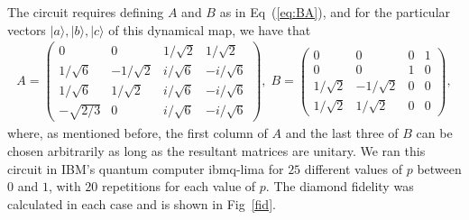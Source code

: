 \documentclass[10pt,letterpaper]{article} %
\newcommand{\fref}[1]{Fig~\ref{#1}}
\newcommand{\eref}[1]{Eq~(\ref{#1})}
\begin{document}
\begin{itemize}
The circuit requires defining $A$ and $B$ as in  \eref{eq:BA}, and for the particular
vectors $|a\rangle, |b\rangle, |c \rangle$ of this dynamical map, we have that
\begin{align*}
A = \begin{pmatrix}
0 & 0 & 1/\sqrt{2} & 1/\sqrt{2} \\
1/\sqrt{6} & -1/\sqrt{2} & i /\sqrt{6} & -i /\sqrt{6} \\
1/\sqrt{6}  & 1/\sqrt{2} & i/\sqrt{6} & -i/\sqrt{6} \\
-\sqrt{2/3} & 0 & i/\sqrt{6} & -i/\sqrt{6}
\end{pmatrix} , \; B = \begin{pmatrix}
0 & 0 & 0& 1 \\
0 & 0 & 1 & 0 \\
1/\sqrt{2} & -1/\sqrt{2} & 0 & 0 \\
1/\sqrt{2} & 1/\sqrt{2} & 0 & 0 
\end{pmatrix},
\end{align*}
where, as mentioned before, the first column of $A$ and the
last three of $B$ can be chosen arbitrarily as long as the resultant matrices are unitary. 
We ran this circuit in IBM's quantum computer ibmq-lima for $25$ different values of $p$ between $0$ and $1$,
with $20$ repetitions for each value of $p$.
The diamond fidelity was calculated in each case and is shown in \fref{fid}.


\end{itemize}
\end{document}

